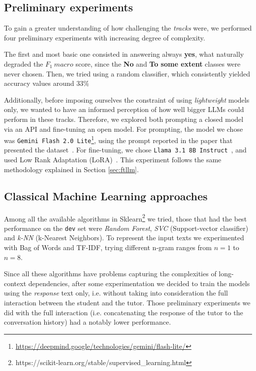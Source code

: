 \documentclass[11pt]{article}
\begin{document}
\subsection{Preliminary experiments}

To gain a greater understanding of how challenging the \textit{tracks} were, we performed four preliminary experiments with increasing degree of complexity.

The first and most basic one consisted in answering always \textbf{yes}, what naturally degraded the $F_1\ macro$ score, since the \textbf{No} and \textbf{To some extent} classes were never chosen.
Then, we tried using a random classifier, which consistently yielded accuracy values around 33\%

Additionally, before imposing ourselves the constraint of using \textit{lightweight} models only, we wanted to have an informed perception of how well bigger LLMs could perform in these tracks.
Therefore, we explored both prompting a closed model via an API and fine-tuning an open model.
For prompting, the model we chose was \texttt{Gemini Flash 2.0 Lite}\footnote{\url{https://deepmind.google/technologies/gemini/flash-lite/}}, using the prompt reported in the paper that presented the dataset~\citep{maurya-etal-2025-unifying}.
For fine-tuning, we chose \texttt{Llama 3.1 8B Instruct}~\cite{llama3modelcard}, and used Low Rank Adaptation (LoRA)~\cite{hu2022lora}.
This experiment follows the same methodology explained in Section \ref{sec:ftllm}.


\subsection{Classical Machine Learning approaches}
Among all the available algorithms in Sklearn\footnote{https://scikit-learn.org/stable/supervised\_learning.html} we tried, those that had the best performance on the \texttt{dev} set were \textit{Random Forest}, \textit{SVC} (Support-vector classifier) and \textit{k-NN} (k-Nearest Neighbors).
To represent the input texts we experimented with Bag of Words and TF-IDF, trying different n-gram ranges from $n=1$ to $n=8$. 

Since all these algorithms have problems capturing the complexities of long-context 
dependencies, after some experimentation we decided to train the models using the \textit{response} text only, i.e. without taking into consideration the full interaction between the student and the tutor.
Those preliminary experiments we did with the full interaction (i.e. concatenating the response of the tutor to the conversation history) had a notably lower performance.
\end{document}
